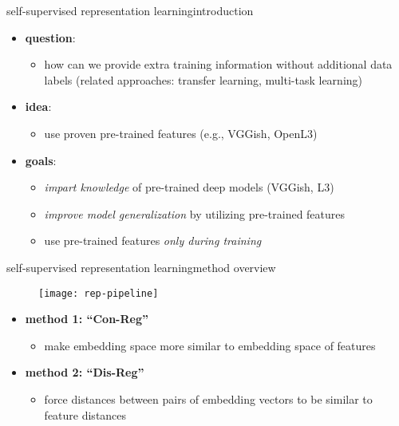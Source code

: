 \begin{frame}{self-supervised representation learning}{introduction}
    \begin{itemize}
        \item   \textbf{question}:
            \begin{itemize}
                \item   how can we provide extra training information without additional data labels (related approaches: transfer learning, multi-task learning)
            \end{itemize}
        \bigskip
        \item   \textbf{idea}: 
            \begin{itemize}
                \item use proven pre-trained features (e.g., VGGish, OpenL3)
            \end{itemize}
        \bigskip
        \item<2->   \textbf{goals}:
            \begin{itemize}
                \item   \textit{impart knowledge} of pre-trained deep models (VGGish, L3)
                \item   \textit{improve model generalization} by utilizing pre-trained features
                \item   use pre-trained features \textit{only during training}
            \end{itemize}
    \end{itemize}
\end{frame}

\begin{frame}{self-supervised representation learning}{method overview}
    \begin{figure}%
        \texttt{[image: rep-pipeline]}%
    \end{figure}
    \bigskip
    \begin{itemize}
        \item   \textbf{method 1: ``Con-Reg''}
            \begin{itemize}
                \item   make embedding space more similar to embedding space of features
            \end{itemize}
            \smallskip
        \item   \textbf{method 2: ``Dis-Reg''}
            \begin{itemize}
                \item   force distances between pairs of embedding vectors to be similar to feature distances 
            \end{itemize}
    \end{itemize}
\end{frame}

